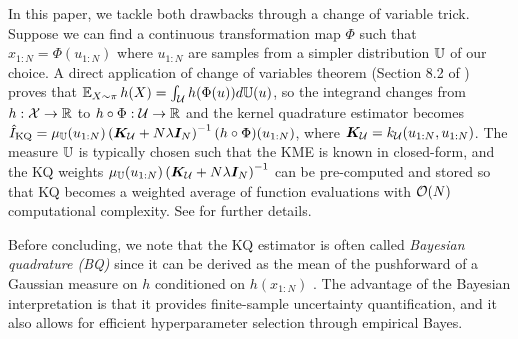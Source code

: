 In this paper, we tackle both drawbacks  through a change of variable trick. 
Suppose we can find a continuous transformation map $\Phi$ such that $x_{1:N} = \Phi(u_{1:N})$ where $u_{1:N}$ are samples from a simpler distribution $\mathbb{U}$ of our choice. 
A direct application of change of variables theorem (Section 8.2 of \citet{stirzaker2003elementary}) proves that $\operatorname{\mathbb{E}}_{X \sim \pi} h(X)  = \int_{\mathcal{U}} h(\Phi(u)) d\mathbb{U}(u)$, so the integrand changes from $h: \mathcal{X} \to \mathbb{R}$ to $h \circ \Phi: \mathcal{U} \to \mathbb{R}$ and the kernel quadrature estimator becomes $\hat{I}_{\text{KQ}} = \mu_{\mathbb{U}}(u_{1:N}) \left(  \boldsymbol{K}_{\mathcal{U}} + N \lambda \boldsymbol{I}_N \right)^{-1} (h \circ \Phi)(u_{1:N})$, where $\boldsymbol{K}_{\mathcal{U}} = k_{\mathcal{U}}(u_{1:N}, u_{1:N})$. 
The measure $\mathbb{U}$ is typically chosen such that the KME is known in closed-form, and the KQ weights $\mu_{\mathbb{U}}(u_{1:N}) \left(  \boldsymbol{K}_{\mathcal{U}} + N \lambda \boldsymbol{I}_N \right)^{-1}$ can be pre-computed and stored so that KQ becomes a weighted average of function evaluations with $\mathcal{O}(N)$ computational complexity. 
See   for further details.


Before concluding, we note that the KQ estimator is often called \emph{Bayesian quadrature (BQ)} \citep{Diaconis1988,OHagan1991,Rasmussen2003,Briol2019PI,Hennig2022} since it can be derived as the mean of the pushforward of a Gaussian measure on $h$ conditioned on $h(x_{1:N})$ \citep{kanagawa2018gaussian}.
The advantage of the Bayesian interpretation is that it provides finite-sample uncertainty quantification, and it also allows for efficient hyperparameter selection through empirical Bayes. 
